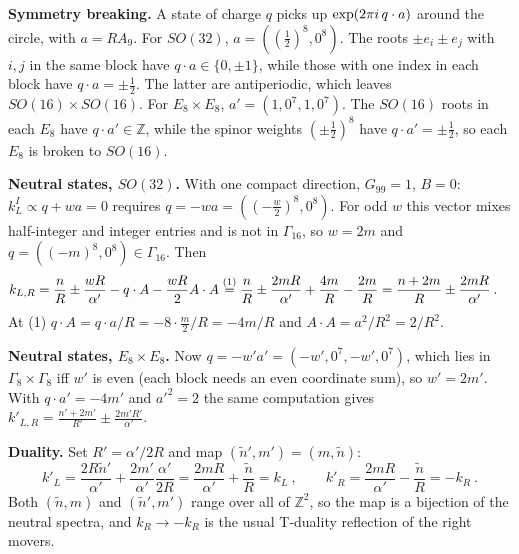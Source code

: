 \begin{tcolorbox}[breakable]
	\begin{remark}
		\textbf{Symmetry breaking.} A state of charge $q$ picks up $\exp(2\pi i\,q\cdot a)$ around the circle, with $a=RA_{9}$. For $SO(32)$, $a=((\frac{1}{2})^{8},0^{8})$. The roots $\pm e_{i}\pm e_{j}$ with $i,j$ in the same block have $q\cdot a\in\{0,\pm1\}$, while those with one index in each block have $q\cdot a=\pm\frac{1}{2}$. The latter are antiperiodic, which leaves $SO(16)\times SO(16)$. For $E_{8}\times E_{8}$, $a'=(1,0^{7},1,0^{7})$. The $SO(16)$ roots in each $E_{8}$ have $q\cdot a'\in\mathds{Z}$, while the spinor weights $(\pm\frac{1}{2})^{8}$ have $q\cdot a'=\pm\frac{1}{2}$, so each $E_{8}$ is broken to $SO(16)$.

		\textbf{Neutral states, $SO(32)$.} With one compact direction, $G_{99}=1$, $B=0$: $k_{L}^{I}\propto q+wa=0$ requires $q=-wa=((-\frac{w}{2})^{8},0^{8})$. For odd $w$ this vector mixes half-integer and integer entries and is not in $\Gamma_{16}$, so $w=2m$ and $q=((-m)^{8},0^{8})\in\Gamma_{16}$. Then
		\begin{align*}
			k_{L,R}&=\frac{n}{R}\pm\frac{wR}{\alpha'}-q\cdot A-\frac{wR}{2}A\cdot A
			\overset{(1)}{=}\frac{n}{R}\pm\frac{2mR}{\alpha'}+\frac{4m}{R}-\frac{2m}{R}=\frac{n+2m}{R}\pm\frac{2mR}{\alpha'}\:.
		\end{align*}
		At (1) $q\cdot A=q\cdot a/R=-8\cdot\frac{m}{2}/R=-4m/R$ and $A\cdot A=a^{2}/R^{2}=2/R^{2}$.

		\textbf{Neutral states, $E_{8}\times E_{8}$.} Now $q=-w'a'=(-w',0^{7},-w',0^{7})$, which lies in $\Gamma_{8}\times\Gamma_{8}$ iff $w'$ is even (each block needs an even coordinate sum), so $w'=2m'$. With $q\cdot a'=-4m'$ and $a'^{2}=2$ the same computation gives $k'_{L,R}=\frac{n'+2m'}{R'}\pm\frac{2m'R'}{\alpha'}$.

		\textbf{Duality.} Set $R'=\alpha'/2R$ and map $(\tilde{n}',m')=(m,\tilde{n})$:
		\begin{equation*}
			k'_{L}=\frac{2R\tilde{n}'}{\alpha'}+\frac{2m'}{\alpha'}\frac{\alpha'}{2R}=\frac{2mR}{\alpha'}+\frac{\tilde{n}}{R}=k_{L}\:,\qquad
			k'_{R}=\frac{2mR}{\alpha'}-\frac{\tilde{n}}{R}=-k_{R}\:.
		\end{equation*}
		Both $(\tilde{n},m)$ and $(\tilde{n}',m')$ range over all of $\mathds{Z}^{2}$, so the map is a bijection of the neutral spectra, and $k_{R}\to-k_{R}$ is the usual T-duality reflection of the right movers.
	\end{remark}
\end{tcolorbox}

